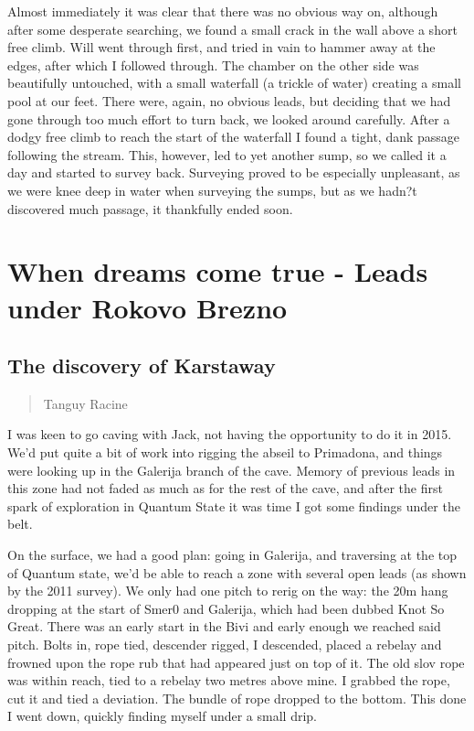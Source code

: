 \documentclass[onecolumn]{book}
\begin{document}
Almost immediately it was clear that there was no obvious way on, although after some desperate searching, we found a small crack in the wall above a short free climb. Will went through first, and tried in vain to hammer away at the edges, after which I followed through. The chamber on the other side was beautifully untouched, with a small waterfall (a trickle of water) creating a small pool at our feet. There were, again, no obvious leads, but deciding that we had gone through too much effort to turn back, we looked around carefully. After a dodgy free climb to reach the start of the waterfall I found a tight, dank passage following the stream. This, however, led to yet another sump, so we called it a day and started to survey back. 
Surveying proved to be especially unpleasant, as we were knee deep in water when surveying the sumps, but as we hadn?t discovered much passage, it thankfully ended soon.


\section{When dreams come true - Leads under Rokovo Brezno} 
\subsection{The discovery of Karstaway}
 \begin{verse}
Tanguy Racine
\end{verse}

I was keen to go caving with Jack, not having the opportunity to do it in 2015. We'd put quite a bit of work into rigging the abseil to Primadona, and things were looking up in the Galerija branch of the cave. Memory of previous leads in this zone had not faded as much as for the rest of the cave, and after the first spark of exploration in Quantum State it was time I got some findings under the belt.

On the surface, we had a good plan: going in Galerija, and traversing at the top of Quantum state, we'd be able to reach a zone with several open leads (as shown by the 2011 survey). We only had one pitch to rerig on the way: the 20m hang dropping at the start of Smer0 and Galerija, which had been dubbed Knot So Great. There was an early start in the Bivi and early enough we reached said pitch. Bolts in, rope tied, descender rigged, I descended, placed a rebelay and frowned upon the rope rub that had appeared just on top of it. The old slov rope was within reach, tied to a rebelay two metres above mine. I grabbed the rope, cut it and tied a deviation. The bundle of rope dropped to the bottom. This done I went down, quickly finding myself under a small drip. 
\end{document}
